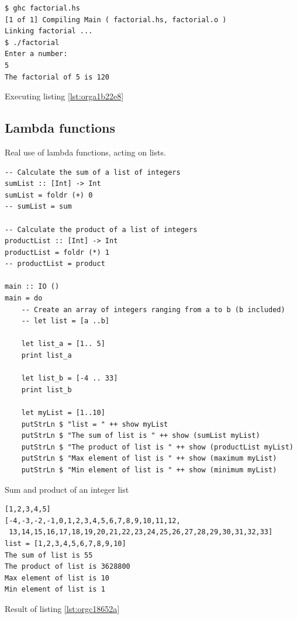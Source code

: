 \documentclass[a4paper, titlepage, twoside]{article}
\begin{document}
\begin{listing}[htbp]
\begin{verbatim}
$ ghc factorial.hs
[1 of 1] Compiling Main ( factorial.hs, factorial.o )
Linking factorial ...
$ ./factorial
Enter a number:
5
The factorial of 5 is 120
\end{verbatim}
\caption{Executing listing \ref{lst:orga1b22e8}}
\end{listing}

\subsection{Lambda functions}
\label{sec:orge9945c3}

Real use of lambda functions, acting on lists.

\begin{listing}[htbp]
\begin{verbatim}
-- Calculate the sum of a list of integers
sumList :: [Int] -> Int
sumList = foldr (+) 0
-- sumList = sum
  
-- Calculate the product of a list of integers
productList :: [Int] -> Int
productList = foldr (*) 1
-- productList = product

main :: IO ()
main = do
    -- Create an array of integers ranging from a to b (b included)
    -- let list = [a ..b]

    let list_a = [1.. 5]
    print list_a

    let list_b = [-4 .. 33]
    print list_b

    let myList = [1..10]
    putStrLn $ "list = " ++ show myList
    putStrLn $ "The sum of list is " ++ show (sumList myList)
    putStrLn $ "The product of list is " ++ show (productList myList)
    putStrLn $ "Max element of list is " ++ show (maximum myList)
    putStrLn $ "Min element of list is " ++ show (minimum myList)
\end{verbatim}
\caption{\label{lst:orgc18652a}Sum and product of an integer list}
\end{listing}

\begin{listing}[htbp]
\begin{verbatim}
[1,2,3,4,5]
[-4,-3,-2,-1,0,1,2,3,4,5,6,7,8,9,10,11,12,
 13,14,15,16,17,18,19,20,21,22,23,24,25,26,27,28,29,30,31,32,33]
list = [1,2,3,4,5,6,7,8,9,10]
The sum of list is 55
The product of list is 3628800
Max element of list is 10
Min element of list is 1
\end{verbatim}
\caption{Result of listing \ref{lst:orgc18652a}}
\end{listing}
\end{document}
